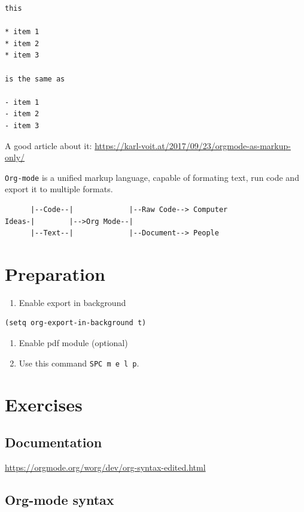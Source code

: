 \documentclass[11pt]{article}
\begin{document}
\begin{verbatim}
this

* item 1
* item 2
* item 3

is the same as

- item 1
- item 2
- item 3
\end{verbatim}

A good article about it: \url{https://karl-voit.at/2017/09/23/orgmode-as-markup-only/}


\texttt{Org-mode} is a unified markup language, capable of formating text, run code and export it to multiple formats.
\begin{verbatim}
      |--Code--|             |--Raw Code--> Computer
Ideas-|        |-->Org Mode--|
      |--Text--|             |--Document--> People
\end{verbatim}


\section{Preparation}
\label{sec:orga007264}
\begin{enumerate}
\item Enable export in background
\end{enumerate}
\begin{verbatim}
(setq org-export-in-background t)
\end{verbatim}

\begin{enumerate}
\item Enable pdf module (optional)
\item Use this command \texttt{SPC m e l p}.
\end{enumerate}


\section{Exercises}
\label{sec:org6d98b70}

\subsection{Documentation}
\label{sec:org13c4363}

\url{https://orgmode.org/worg/dev/org-syntax-edited.html}

\subsection{Org-mode syntax}
\label{sec:org48e5c32}
\end{document}
